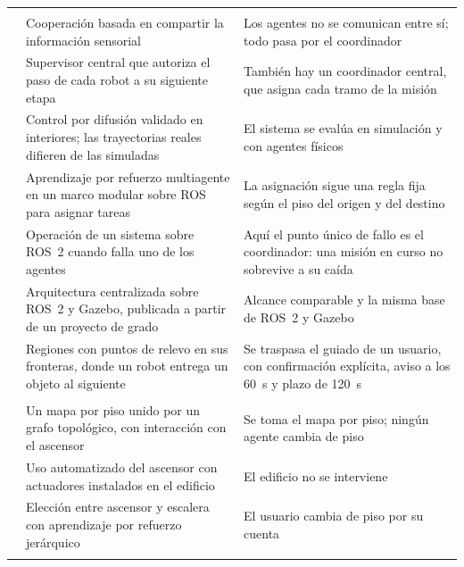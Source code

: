 {\begin{longtable}{@{}>{\raggedright\arraybackslash}p{}>{\raggedright\arraybackslash}p{}>{\raggedright\arraybackslash}p{}@{}}
    \multicolumn{3}{@{}l}{\textit{Coordinación entre robots}} \\ \addlinespace
    \textcite{nair2024collaborative} & Cooperación basada en compartir la información sensorial & Los agentes no se comunican entre sí; todo pasa por el coordinador \\ \addlinespace
    \textcite{roszkowska2023multilevel} & Supervisor central que autoriza el paso de cada robot a su siguiente etapa & También hay un coordinador central, que asigna cada tramo de la misión \\ \addlinespace
    \textcite{rudrusamy2022broadcast} & Control por difusión validado en interiores; las trayectorias reales difieren de las simuladas & El sistema se evalúa en simulación y con agentes físicos \\ \addlinespace
    \textcite{xu2026modular} & Aprendizaje por refuerzo multiagente en un marco modular sobre ROS para asignar tareas & La asignación sigue una regla fija según el piso del origen y del destino \\ \addlinespace
    \textcite{zhang2025kubernetes} & Operación de un sistema sobre ROS~2 cuando falla uno de los agentes & Aquí el punto único de fallo es el coordinador: una misión en curso no sobrevive a su caída \\ \addlinespace
    \textcite{yumbla2025open} & Arquitectura centralizada sobre ROS~2 y Gazebo, publicada a partir de un proyecto de grado \autocite{piguave2023multirobot} & Alcance comparable y la misma base de ROS~2 y Gazebo \\ \addlinespace
    \textcite{srivastava2026deliver} & Regiones con puntos de relevo en sus fronteras, donde un robot entrega un objeto al siguiente & Se traspasa el guiado de un usuario, con confirmación explícita, aviso a los 60~s y plazo de 120~s \\ \addlinespace
    \multicolumn{3}{@{}l}{\textit{Movilidad entre pisos}} \\ \addlinespace
    \textcite{kim2024indoor} & Un mapa por piso unido por un grafo topológico, con interacción con el ascensor & Se toma el mapa por piso; ningún agente cambia de piso \\ \addlinespace
    \textcite{song2024elevator} & Uso automatizado del ascensor con actuadores instalados en el edificio & El edificio no se interviene \\ \addlinespace
    \textcite{luo2025elevator} & Elección entre ascensor y escalera con aprendizaje por refuerzo jerárquico & El usuario cambia de piso por su cuenta \\ \addlinespace

\end{longtable}}

